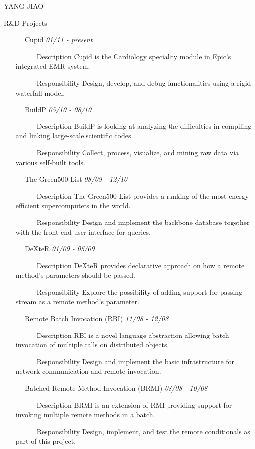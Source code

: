 \documentclass{article}
\begin{document}
\begin{cv}{YANG JIAO}
\begin{cvlist}{R\&D Projects}
\item [~~~~~~Cupid] \hfill {\it 01/11 - present}
\begin{itemize}
\item [~~~~~~Description] Cupid is the Cardiology speciality module in Epic's integrated EMR system.  
\item [~~~~~~Responsibility] Design, develop, and debug functionalities using a rigid waterfall model.
\end{itemize}
\item [~~~~~~BuildP] \hfill {\it 05/10 - 08/10}
\begin{itemize}
\item [~~~~~~Description] BuildP is looking at analyzing the difficulties in compiling and linking large-scale scientific codes. 
\item [~~~~~~Responsibility] Collect, process, visualize, and mining raw data via various self-built tools.
\end{itemize}
\item [~~~~~~The Green500 List] \hfill {\it 08/09 - 12/10}
\begin{itemize}
\item [~~~~~~Description] The Green500 List provides a ranking of the most energy-efficient supercomputers in the world. 
\item [~~~~~~Responsibility] Design and implement the backbone database together with the front end user interface for queries.
\end{itemize}
\item [~~~~~~DeXteR] \hfill {\it 01/09 - 05/09}
\begin{itemize}
\item [~~~~~~Description] DeXteR provides declarative approach on how a remote method's parameters should be passed. 
\item [~~~~~~Responsibility] Explore the possibility of adding support for passing stream as a remote method's parameter.
\end{itemize}
\item [~~~~~~Remote Batch Invocation (RBI)] \hfill {\it 11/08 - 12/08}
\begin{itemize}
\item [~~~~~~Description] RBI is a novel language abstraction allowing batch invocation of multiple calls on distributed objects\cite{Ibrahim0907}.
\item [~~~~~~Responsibility] Design and implement the basic infrastructure for network communication and remote invocation.
\end{itemize}
\item [~~~~~~Batched Remote Method Invocation (BRMI)] \hfill {\it 08/08 - 10/08}
\begin{itemize}
\item [~~~~~~Description] BRMI is an extension of RMI providing support for invoking multiple remote methods in a batch\cite{Tilevich0906}.
\item [~~~~~~Responsibility] Design, implement, and test the remote conditionals as part of this project.
\end{itemize}
\end{cvlist}


\end{cv}
\end{document}

